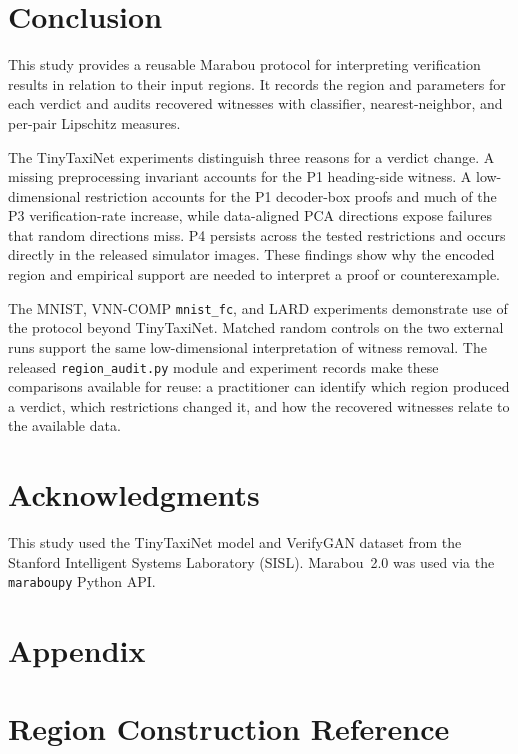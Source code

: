 \documentclass[twocolumn,smallextended,runningheads]{svjour3}
\begin{document}
\section{Conclusion}


This study provides a reusable Marabou protocol for interpreting verification results in relation to their input regions. It records the region and parameters for each verdict and audits recovered witnesses with classifier, nearest-neighbor, and per-pair Lipschitz measures.

The TinyTaxiNet experiments distinguish three reasons for a verdict change. A missing preprocessing invariant accounts for the P1 heading-side witness. A low-dimensional restriction accounts for the P1 decoder-box proofs and much of the P3 verification-rate increase, while data-aligned PCA directions expose failures that random directions miss. P4 persists across the tested restrictions and occurs directly in the released simulator images. These findings show why the encoded region and empirical support are needed to interpret a proof or counterexample.

The MNIST, VNN-COMP \texttt{mnist\_fc}, and LARD experiments demonstrate use of the protocol beyond TinyTaxiNet. Matched random controls on the two external runs support the same low-dimensional interpretation of witness removal. The released \texttt{region\_audit.py} module and experiment records make these comparisons available for reuse: a practitioner can identify which region produced a verdict, which restrictions changed it, and how the recovered witnesses relate to the available data.

\section*{Acknowledgments}

This study used the TinyTaxiNet model and VerifyGAN dataset from the Stanford Intelligent Systems Laboratory (SISL). Marabou~2.0 was used via the \texttt{maraboupy} Python API.

\section*{Appendix}
\appendix
\renewcommand{\thesection}{\Alph{section}}

\section{Region Construction Reference}
\label{app:construction_ref}
\end{document}
